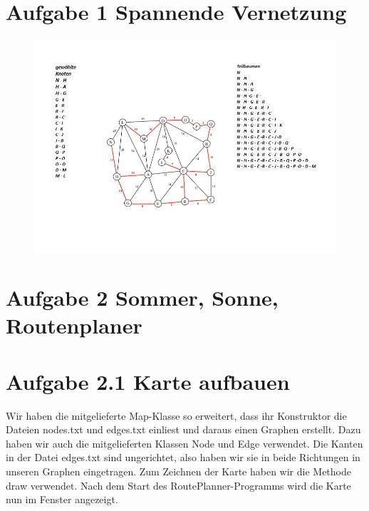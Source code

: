 \documentclass{pi2}
\begin{document}
\section*{Aufgabe 1 Spannende Vernetzung}

\begin{figure}[h]
	\centering
	\includegraphics[width=1\linewidth]{"Screenshot_1.png"}
	\caption{}
	\label{fig:Screenschot_1}
\end{figure}
\section*{Aufgabe 2 Sommer, Sonne, Routenplaner}
\section*{Aufgabe 2.1 Karte aufbauen}

Wir haben die mitgelieferte Map-Klasse so erweitert, dass ihr Konstruktor die Dateien nodes.txt und edges.txt einliest und daraus einen Graphen erstellt. Dazu haben wir auch die mitgelieferten Klassen Node und Edge verwendet. Die Kanten in der Datei edges.txt sind ungerichtet, also haben wir sie in beide Richtungen in unseren Graphen eingetragen. Zum Zeichnen der Karte haben wir die Methode draw verwendet. Nach dem Start des RoutePlanner-Programms wird die Karte nun im Fenster angezeigt.



\end{document}
